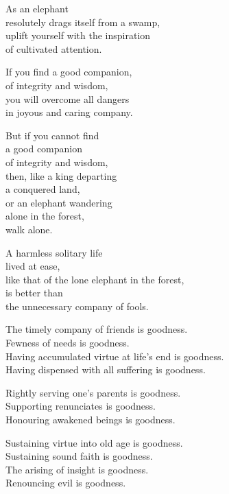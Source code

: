 As an elephant\\
resolutely drags itself from a swamp,\\
uplift yourself with the inspiration\\
of cultivated attention.

If you find a good companion,\\
of integrity and wisdom,\\
you will overcome all dangers\\
in joyous and caring company.


But if you cannot find\\
a good companion\\
of integrity and wisdom,\\
then, like a king departing\\
a conquered land,\\
or an elephant wandering\\
alone in the forest,\\
walk alone.


A harmless solitary life\\
lived at ease,\\
like that of the lone elephant in the forest,\\
is better than\\
the unnecessary company of fools.


The timely company of friends is goodness.\\
Fewness of needs is goodness.\\
Having accumulated virtue at life’s end is goodness.\\
Having dispensed with all suffering is goodness.


Rightly serving one's parents is goodness.\\
Supporting renunciates is goodness.\\
Honouring awakened beings is goodness.


Sustaining virtue into old age is goodness.\\
Sustaining sound faith is goodness.\\
The arising of insight is goodness.\\
Renouncing evil is goodness.

